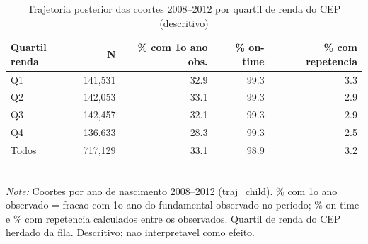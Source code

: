 \begin{table}[htbp]\centering
\caption{Trajetoria posterior das coortes 2008--2012 por quartil de renda do CEP (descritivo)}
\label{tab:T8a_traj}
\small
\setlength{\tabcolsep}{4pt}
\begin{tabular}{lrrrr}
\toprule
Quartil renda & N & \% com 1o ano obs. & \% on-time & \% com repetencia \\
\midrule
Q1 & 141,531 & 32.9 & 99.3 & 3.3 \\
Q2 & 142,053 & 33.1 & 99.3 & 2.9 \\
Q3 & 142,457 & 32.1 & 99.3 & 2.9 \\
Q4 & 136,633 & 28.3 & 99.3 & 2.5 \\
\midrule
Todos & 717,129 & 33.1 & 98.9 & 3.2 \\
\bottomrule
\end{tabular}
\\[3pt]{\footnotesize \textit{Note:} Coortes por ano de nascimento 2008--2012 (traj\_child). \% com 1o ano observado = fracao com 1o ano do fundamental observado no periodo; \% on-time e \% com repetencia calculados entre os observados. Quartil de renda do CEP herdado da fila. Descritivo; nao interpretavel como efeito.}
\end{table}
